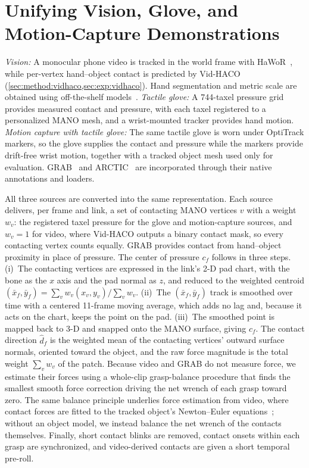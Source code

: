 
\section{Unifying Vision, Glove, and Motion-Capture Demonstrations}
\label{app:data_unification}

\emph{Vision:} A monocular phone video is tracked in the world frame with HaWoR~\citep{hawor}, while per-vertex hand--object contact is predicted by Vid-HACO (\cref{sec:method:vidhaco,sec:exp:vidhaco}). Hand segmentation and metric scale are obtained using off-the-shelf models~\citep{sam2, depthanything}.
\emph{Tactile glove:} A 744-taxel pressure grid provides measured contact and pressure, with each taxel registered to a personalized MANO mesh, and a wrist-mounted tracker provides hand motion.
\emph{Motion capture with tactile glove:} The same tactile glove is worn under OptiTrack markers, so the glove supplies the contact and pressure while the markers provide drift-free wrist motion, together with a tracked object mesh used only for evaluation. GRAB~\citep{grab} and ARCTIC~\citep{arctic} are incorporated through their native annotations and loaders.

All three sources are converted into the same \fca representation. Each source delivers, per frame and link, a set of contacting MANO vertices $v$ with a weight $w_v$: the registered taxel pressure for the glove and motion-capture sources, and $w_v = 1$ for video, where Vid-HACO outputs a binary contact mask, so every contacting vertex counts equally. GRAB provides contact from hand--object proximity in place of pressure. The center of pressure $c_f$ follows in three steps. (i)~The contacting vertices are expressed in the link's 2-D pad chart, with the bone as the $x$ axis and the pad normal as $z$, and reduced to the weighted centroid $(\bar{x}_f, \bar{y}_f) = \sum_v w_v (x_v, y_v) / \sum_v w_v$. (ii)~The $(\bar{x}_f, \bar{y}_f)$ track is smoothed over time with a centered 11-frame moving average, which adds no lag and, because it acts on the chart, keeps the point on the pad. (iii)~The smoothed point is mapped back to 3-D and snapped onto the MANO surface, giving $c_f$. The contact direction $\hat{d}_f$ is the weighted mean of the contacting vertices' outward surface normals, oriented toward the object, and the raw force magnitude is the total weight $\sum_v w_v$ of the patch. Because video and GRAB do not measure force, we estimate their forces using a whole-clip grasp-balance procedure that finds the smallest smooth force correction driving the net wrench of each grasp toward zero. The same balance principle underlies force estimation from video, where contact forces are fitted to the tracked object's Newton--Euler equations~\citep{pham2015force, pham2018}; without an object model, we instead balance the net wrench of the contacts themselves. Finally, short contact blinks are removed, contact onsets within each grasp are synchronized, and video-derived contacts are given a short temporal pre-roll.



